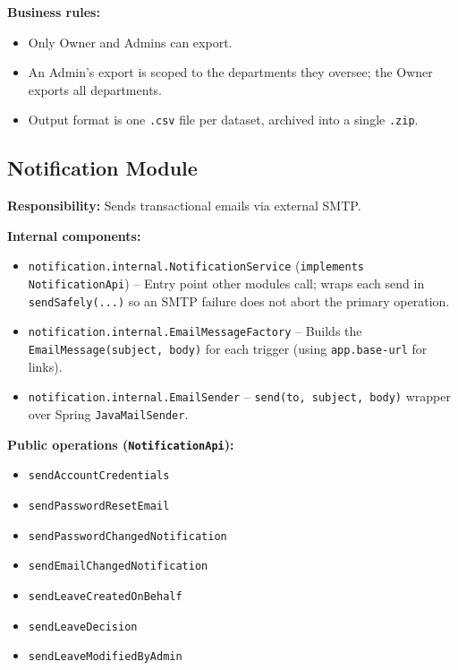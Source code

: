 \documentclass[11pt,a4paper]{article}
\begin{document}
\textbf{Business rules:}
\begin{itemize}[leftmargin=1.5em]
    \item Only Owner and Admins can export.
    \item An Admin's export is scoped to the departments they oversee; the Owner exports all departments.
    \item Output format is one \texttt{.csv} file per dataset, archived into a single \texttt{.zip}.
\end{itemize}

\subsection{Notification Module}

\textbf{Responsibility:} Sends transactional emails via external SMTP.

\textbf{Internal components:}
\begin{itemize}[leftmargin=1.5em]
    \item \texttt{notification.internal.NotificationService} (\texttt{implements NotificationApi}) -- Entry point other modules call; wraps each send in \texttt{sendSafely(...)} so an SMTP failure does not abort the primary operation.
    \item \texttt{notification.internal.EmailMessageFactory} -- Builds the \texttt{EmailMessage(subject, body)} for each trigger (using \texttt{app.base-url} for links).
    \item \texttt{notification.internal.EmailSender} -- \texttt{send(to, subject, body)} wrapper over Spring \texttt{JavaMailSender}.
\end{itemize}

\textbf{Public operations (\texttt{NotificationApi}):}
\begin{itemize}[noitemsep, leftmargin=1.5em]
    \item \texttt{sendAccountCredentials}
    \item \texttt{sendPasswordResetEmail}
    \item \texttt{sendPasswordChangedNotification}
    \item \texttt{sendEmailChangedNotification}
    \item \texttt{sendLeaveCreatedOnBehalf}
    \item \texttt{sendLeaveDecision}
    \item \texttt{sendLeaveModifiedByAdmin}
\end{itemize}
\end{document}
